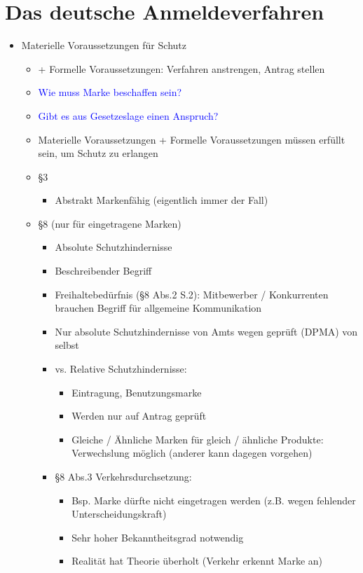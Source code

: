 \documentclass{report}
\begin{document}
\section{Das deutsche Anmeldeverfahren}
\begin{itemize}
	\item Materielle Voraussetzungen für Schutz \label{Materielle-Voraussetzungen}
	\begin{itemize}
		\item + Formelle Voraussetzungen: Verfahren anstrengen, Antrag stellen
		\item \textcolor{blue}{Wie muss Marke beschaffen sein?}
		\item \textcolor{blue}{Gibt es aus Gesetzeslage einen Anspruch?}
		\item Materielle Voraussetzungen + Formelle Voraussetzungen müssen erfüllt sein, um Schutz zu erlangen
		\item §3
		\begin{itemize}
			\item Abstrakt Markenfähig (eigentlich immer der Fall)
		\end{itemize}
		\item §8 (nur für eingetragene Marken)
		\begin{itemize}
			\item Absolute Schutzhindernisse
			\item Beschreibender Begriff
			\item Freihaltebedürfnis (§8 Abs.2 S.2):
			\newline Mitbewerber / Konkurrenten brauchen Begriff für allgemeine Kommunikation
			\item Nur absolute Schutzhindernisse von Amts wegen geprüft (DPMA) von selbst
			\item vs. Relative Schutzhindernisse:
			\begin{itemize}
				\item Eintragung, Benutzungsmarke
				\item Werden nur auf Antrag geprüft
				\item Gleiche / Ähnliche Marken für gleich / ähnliche Produkte: Verwechslung möglich (anderer kann dagegen vorgehen)
			\end{itemize}
			\item §8 Abs.3 Verkehrsdurchsetzung:
			\begin{itemize}
				\item Bsp. Marke dürfte nicht eingetragen werden (z.B. wegen fehlender Unterscheidungskraft)
				\item Sehr hoher Bekanntheitsgrad notwendig
				\item Realität hat Theorie überholt (Verkehr erkennt Marke an)
			\end{itemize}
		\end{itemize}
	\end{itemize}
\end{itemize}
\end{document}
